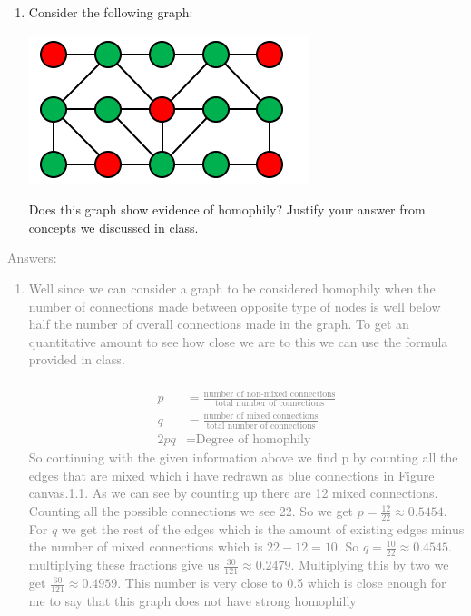 \documentclass[11pt]{article}
\begin{document}
\begin{enumerate} 
	\item Consider the following graph:
	\begin{center}
		\includegraphics[scale=1]{canvas-1}\\
	\end{center}
 	Does this graph show evidence of homophily? Justify your answer from concepts we discussed in class.
\end{enumerate}
\textcolor{gray}{
Answers:
\begin{enumerate} 
		\item Well since we can consider a graph to be considered homophily when the number of connections made between opposite type of nodes is well below half the number of overall connections made in the graph. To get an quantitative amount to see how close we are to this we can use the formula provided in class.\\\\
	\begin{align}
		p 	&=	\frac{\text{number of non-mixed connections}}{\text{total number of connections}}\\
		q 	&=	\frac{\text{number of mixed connections}}{\text{total number of connections}}\\
		2pq &= \text{Degree of homophily}
	\end{align} 
So continuing with the given information above we find p by counting all the edges that are mixed which i have redrawn as blue connections in Figure canvas.1.1.  As we can see by counting up there are 12 mixed connections.  Counting all the possible connections we see 22.  So we get $p = \frac{12}{22} \approx 0.5454$.  For $q$ we get the rest of the edges which is the amount of existing edges minus the number of mixed connections which is $22 - 12 = 10$.  So $q=\frac{10}{22} \approx 0.4545$.  multiplying these fractions give us $\frac{30}{121} \approx 0.2479$. Multiplying this by two we get $\frac{60}{121} \approx 0.4959$.  This number is very close to 0.5 which is close enough for me to say that this graph does not have strong homophilly 
\end {enumerate}}
\end{document}
